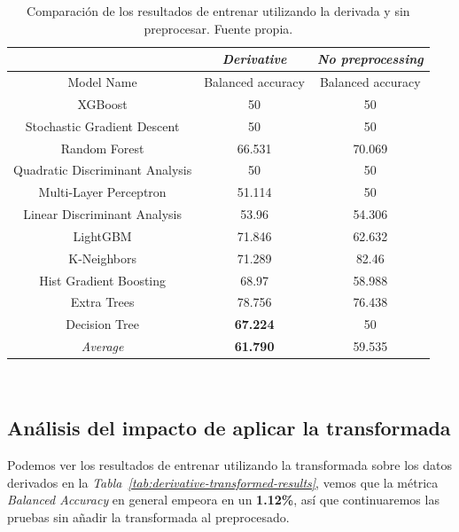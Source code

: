 \begin{table}[!ht]
    \centering
    \begin{tabular}{|c|c|c|}
        \hline
        & \textit{Derivative} & \textit{No preprocessing} \\ \hline
        Model Name & Balanced accuracy & Balanced accuracy \\ \hline
        XGBoost & 50 & 50 \\ 
        Stochastic Gradient Descent & 50 & 50 \\ 
        Random Forest & 66.531 & 70.069 \\ 
        Quadratic Discriminant Analysis & 50 & 50 \\ 
        Multi-Layer Perceptron & 51.114 & 50 \\ 
        Linear Discriminant Analysis & 53.96 & 54.306 \\ 
        LightGBM & 71.846 & 62.632 \\ 
        K-Neighbors & 71.289 & 82.46 \\ 
        Hist Gradient Boosting & 68.97 & 58.988 \\ 
        Extra Trees & 78.756 & 76.438 \\ 
        Decision Tree & \textbf{67.224} & 50 \\ \hline
        \textit{Average} & \textbf{61.790} & 59.535 \\ \hline
    \end{tabular}
    \caption{Comparación de los resultados de entrenar utilizando la derivada y sin preprocesar. Fuente propia.}\ \label{tab:nopreprocessing-derivative-results}
\end{table}

\subsection{Análisis del impacto de aplicar la transformada}

Podemos ver los resultados de entrenar utilizando la transformada sobre los datos derivados en la \textit{Tabla\ \ref{tab:derivative-transformed-results}}, vemos que la métrica \textit{Balanced Accuracy} en general empeora en un \textbf{1.12\%}, así que continuaremos las pruebas sin añadir la transformada al preprocesado.

